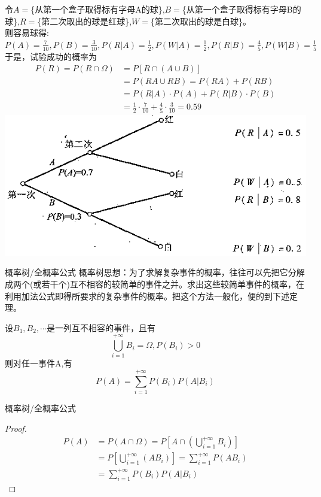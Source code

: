 \documentclass[xcolor=svgnames,serif,table,10pt]{beamer}
\begin{document}
\begin{frame}
\begin{solution}
	令$A=$\{从第一个盒子取得标有字母A的球\},$B=$\{从第一个盒子取得标有字母B的球\},$R=$\{第二次取出的球是红球\},$W=$\{第二次取出的球是白球\}。\\
	则容易球得: $P(A)=\frac{7}{10}, P(B)=\frac{3}{10}, P(R|A)=\frac{1}{2},P(W|A)=\frac{1}{2},P(R|B)=\frac{4}{5},P(W|B)=\frac{1}{5}$\\
	于是，试验成功的概率为
	\begin{align*}
	P(R)=P(R\cap\Omega)&=P[R\cap(A\cup B)]\\
	&=P(RA\cup RB)=P(RA)+P(RB)\\
	&=P(R|A)\cdot P(A)+P(R|B)\cdot P(B)\\
	&=\frac{1}{2}\cdot\frac{7}{10}+\frac{4}{5}\cdot\frac{3}{10}=0.59
	\end{align*}
	\includegraphics[scale=0.18]{tree}
\end{solution}
\end{frame}

\begin{frame}{概率树/全概率公式}
概率树思想：为了求解复杂事件的概率，往往可以先把它分解成两个(或若干个)互不相容的较简单的事件之并。求出这些较简单事件的概率，在利用加法公式即得所要求的复杂事件的概率。把这个方法一般化，便的到下述定理。
\begin{theorem}
	设$B_1,B_2,\cdots$是一列互不相容的事件，且有
	\[\bigcup_{i=1}^{+\infty}B_i=\Omega,P(B_i)>0 \]
	则对任一事件A,有
	\[P(A)=\sum_{i=1}^{+\infty}P(B_i)P(A|B_i) \]	
\end{theorem}
\end{frame}

\begin{frame}{概率树/全概率公式}
\begin{proof}
	\begin{align*}
	P(A)&=P(A\cap\Omega)=P[A\cap(\bigcup_{i=1}^{+\infty}B_i)]\\
	&=P[\bigcup_{i=1}^{+\infty}(AB_i)]=\sum_{i=1}^{+\infty}P(AB_i)\\
	&=\sum_{i=1}^{+\infty}P(B_i)P(A|B_i)
	\end{align*}
\end{proof}
\end{frame}
\end{document}
